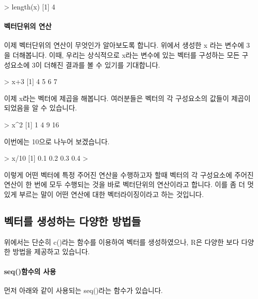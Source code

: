 \documentclass{book}
\begin{document}
\begin{Schunk}
\begin{Soutput}
> length(x)
[1] 4
\end{Soutput}
\end{Schunk}

\paragraph{벡터단위의 연산}  이제 벡터단위의 연산이 무엇인가 알아보도록 합니다. 
위에서 생성한 x 라는 변수에 3 을 더해봅니다. 
이때, 우리는 상식적으로 x라는 변수에 있는 벡터를 구성하는 모든 구성요소에 3이 더해진 결과를 볼 수 있기를 기대합니다. 

\begin{Schunk}
\begin{Soutput}
> x+3
[1] 4 5 6 7	
\end{Soutput}
\end{Schunk}

이제 x라는 벡터에 제곱을 해봅니다. 
여러분들은 벡터의 각 구성요소의 값들이 제곱이 되었음을 알 수 있습니다. 
\begin{Schunk}
\begin{Soutput}
> x^2
[1]  1  4  9 16
\end{Soutput}
\end{Schunk}

이번에는 10으로 나누어 보겠습니다.

\begin{Schunk}
\begin{Soutput}
> x/10
[1] 0.1 0.2 0.3 0.4
> 
\end{Soutput}
\end{Schunk}

이렇게 어떤 벡터에 특정 주어진 연산을 수행하고자 할때 벡터의 각 구성요소에 주어진 연산이 한 번에 모두 수행되는 것을 바로 벡터단위의 연산이라고 합니다. 
이를 좀 더 멋있게 부르는 말이 어떤 연산에 대한 벡터라이징이라고 하는 것입니다. 


\subsection{벡터를 생성하는 다양한 방법들}

위에서는 단순히 c()라는 함수를 이용하여 벡터를 생성하였으나, R은 다양한 보다 다양한 방법을 제공하고 있습니다. 

\paragraph{seq()함수의 사용} 먼저 아래와 같이 사용되는 seq()라는 함수가 있습니다. 
\end{document}
